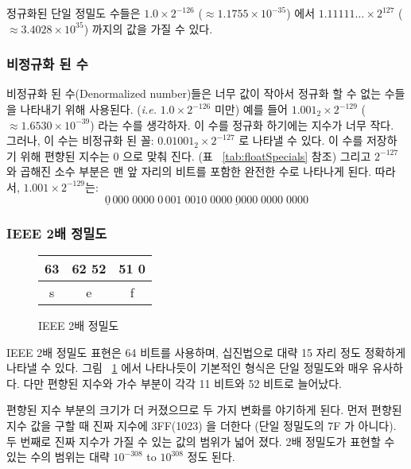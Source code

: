 정규화된 단일 정밀도 수들은 $1.0 \times 2^{-126}$ ($\approx 1.1755 \times 10^{-35}$) 에서 
$1.11111\ldots \times 2^{127}$ ($\approx 3.4028 \times 10^{35}$) 까지의 값을 가질 수 있다.

\subsubsection{비정규화 된 수}

비정규화 된 수(Denormalized number)들은 너무 값이 작아서 정규화 할 수 없는 수들을 나타내기 위해 사용된다.
(\emph{i.e.} $1.0 \times 2^{-126}$ 미만) 예를 들어 $1.001_2 \times 2^{-129}$ ($\approx 1.6530 \times 10^{-39}$) 라는
수를 생각하자. 이 수를 정규화 하기에는 지수가 너무 작다. 그러나, 이 수는 비정규화 된 꼴:
$0.01001_2 \times 2^{-127}$ 로 나타낼 수 있다. 이 수를 저장하기 위해 편향된 지수는
0 으로 맞춰 진다. (표 ~\ref{tab:floatSpecials} 참조) 그리고 $2^{-127}$ 와 곱해진
소수 부분은 맨 앞 자리의 비트를 포함한 완전한 수로 나타나게 된다. 따라서, $1.001 \times 2^{-129}$는:
\[ \underline{0}\,000\;0000\;0
   \,\underline{001\;0010\;0000\;0000\;0000\;0000} \]


\subsubsection{IEEE 2배 정밀도}

\begin{figure}[t]
\centering
\begin{tabular}{|c|c|c|}
\multicolumn{1}{p{0.3cm}}{63} &
\multicolumn{1}{p{3cm}}{62 \hfill 52} &
\multicolumn{1}{p{7cm}}{51 \hfill 0} \\
\hline
s & e & f \\
\hline
\end{tabular}
\caption{IEEE 2배 정밀도\label{fig:IEEEdouble}}
\end{figure}

IEEE 2배 정밀도 표현은 64 비트를 사용하며, 십진법으로 대략 15 자리 정도 정확하게
나타낼 수 있다. 그림 ~\ref{fig:IEEEdouble} 에서 나타나듯이 기본적인 형식은
단일 정밀도와 매우 유사하다. 다만 편향된 지수와 가수 부분이 각각 11 비트와 
52 비트로 늘어났다.  

편향된 지수 부분의 크기가 더 커졌으므로 두 가지 변화를 야기하게 된다. 먼저
편향된 지수 값을 구할 때 진짜 지수에 3FF(1023) 을 더한다 (단일 정밀도의 7F 가 아니다).
두 번째로 진짜 지수가 가질 수 있는 값의 범위가 넓어 졌다.
2배 정밀도가 표현할 수 있는 수의 범위는 대략  $10^{-308}$ to $10^{308}$ 정도 된다. 

